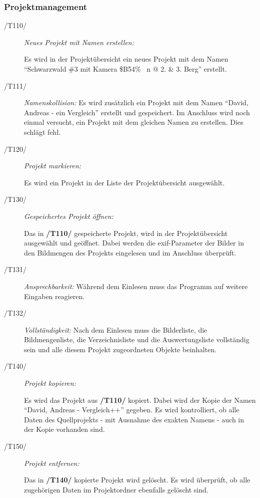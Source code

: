 	\subsubsection{Projektmanagement}
	
		\begin{description}
		
			\item[/T110/] \textit{Neues Projekt mit Namen erstellen:}\par Es wird in der Projektübersicht ein neues Projekt mit dem Namen "`Schwarzwald \#3 mit Kamera \$B54\% ~n @ 2. \& 3. Berg"' erstellt.
			
			\item[/T111/] \textit{Namenskollision:} Es wird zusätzlich ein Projekt mit dem Namen "`David, Andreas - ein Vergleich"' erstellt und gespeichert. Im Anschluss wird noch einmal versucht, ein Projekt mit dem gleichen Namen zu erstellen. Dies schlägt fehl.
				
			\item[/T120/] \textit{Projekt markieren:}\par Es wird ein Projekt in der Liste der Projektübersicht ausgewählt.
				
			\item[/T130/] \textit{Gespeichertes Projekt öffnen:}\par Das in \textbf{/T110/} gespeicherte Projekt, wird in der Projektübersicht ausgewählt und geöffnet. Dabei werden die \gls{exif}-Parameter der Bilder in den Bildmengen des Projekts eingelesen und im Anschluss überprüft.

			\item[/T131/] \textit{Ansprechbarkeit:}	Während dem Einlesen muss das Programm auf weitere Eingaben reagieren.
			
			\item[/T132/] \textit{Vollständigkeit:} Nach dem Einlesen muss die Bilderliste, die Bildmengenliste, die Verzeichnisliste und die Auswertungsliste vollständig sein und alle diesem Projekt zugeordneten Objekte beinhalten.
			
			\item[/T140/] \textit{Projekt kopieren:}\par Es wird das Projekt aus \textbf{/T110/} kopiert. Dabei wird der Kopie der Namen "`David, Andreas - Vergleich++"' gegeben. Es wird kontrolliert, ob alle Daten des Quellprojekts - mit Ausnahme des exakten Namens - auch in der Kopie vorhanden sind.
				
			\item[/T150/] \textit{Projekt entfernen:}\par Das in \textbf{/T140/} kopierte Projekt wird gelöscht. Es wird überprüft, ob alle zugehörigen Daten im Projektordner ebenfalls gelöscht sind.
		
		\end{description}
	
